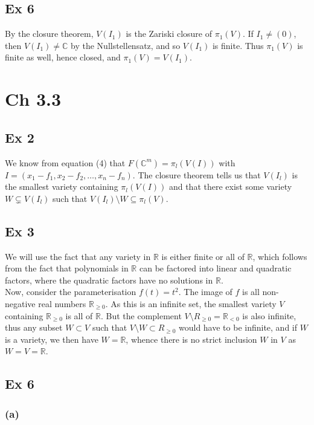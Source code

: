 \documentclass{article}
\theoremstyle{definition}
\newcommand{\R}{\mathbb{R}}
\newcommand{\C}{\mathbb{C}}
\begin{document}
\subsection*{Ex 6}

By the closure theorem, $V(I_1)$ is the Zariski closure of $\pi_1(V)$. If $I_1
\not = (0)$, then $V(I_1) \not = \C$ by the Nullstellensatz, and so $V(I_1)$ is
finite. Thus $\pi_1(V)$ is finite as well, hence closed, and $\pi_1(V) =
V(I_1)$.


\section*{Ch 3.3}

\subsection*{Ex 2}

We know from equation (4) that $F(\C^{m}) = \pi_{l}(V(I))$ with $I = (x_1 -
f_1, x_2 - f_2, \ldots, x_n - f_n)$. The closure theorem tells us that
$V(I_{l})$ is the smallest variety containing $\pi_{l}(V(I))$ and that there
exist some variety $W \subsetneq V(I_{l})$ such that $V(I_{l}) \setminus W
\subseteq \pi_l(V)$.

\subsection*{Ex 3}

We will use the fact that any variety in $\R$ is either finite or all of $\R$,
which follows from the fact that polynomials in $\R$ can be factored into
linear and quadratic factors, where the quadratic factors have no solutions in
$\R$. \\

Now, consider the parameterisation $f(t) = t^2$. The image of $f$ is all
non-negative real numbers $\R_{\geq 0}$. As this is an infinite set, the
smallest variety $V$ containing $\R_{\geq 0}$ is all of $\R$. But the
complement $V \setminus R_{\geq 0} = \R_{< 0}$ is also infinite, thus any
subset $W \subset V$ such that $V \setminus W \subset R_{\geq 0}$ would have to
be infinite, and if $W$ is a variety, we then have $W = \R$, whence there is no
strict inclusion $W$ in $V$ as $W = V = \R$.

\subsection*{Ex 6}
\subsubsection*{(a)}
\end{document}
